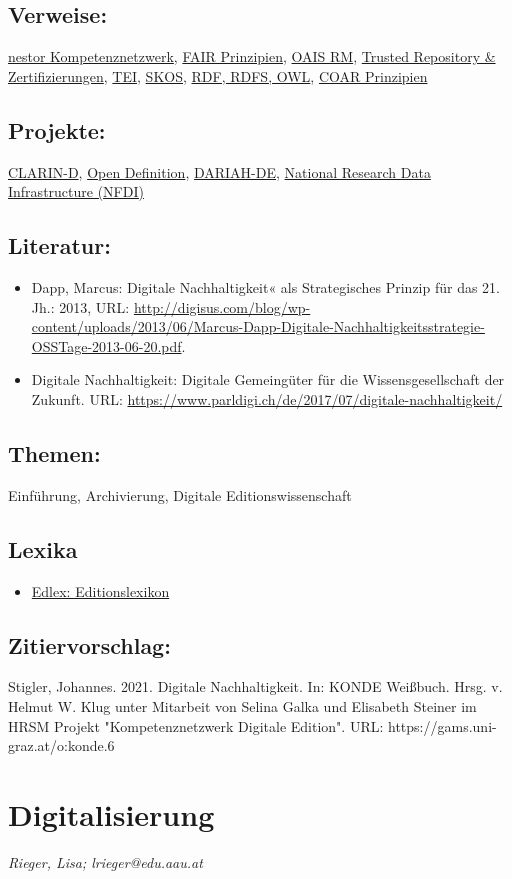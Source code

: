 \documentclass{article}
\begin{document}
        \subsection*{Verweise:}\href{https://gams.uni-graz.at/o:konde.4}{nestor Kompetenznetzwerk}, \href{https://gams.uni-graz.at/o:konde.7}{FAIR Prinzipien}, \href{https://gams.uni-graz.at/o:konde.11}{OAIS RM}, \href{https://gams.uni-graz.at/o:konde.13}{Trusted Repository & Zertifizierungen}, \href{https://gams.uni-graz.at/o:konde.178}{TEI}, \href{https://gams.uni-graz.at/o:konde.132}{SKOS}, \href{https://gams.uni-graz.at/o:konde.131}{RDF, RDFS, OWL}, \href{https://gams.uni-graz.at/o:konde.3}{COAR Prinzipien}\subsection*{Projekte:}\href{https://www.clarin-d.net/de/}{CLARIN-D}, \href{http://opendefinition.org/}{Open Definition}, \href{https://de.dariah.eu/}{DARIAH-DE}, \href{https://www.youtube.com/watch?v=x3Cvn1vNQ98&feature=youtu.be}{National Research Data Infrastructure (NFDI)}\subsection*{Literatur:}\begin{itemize}\item Dapp, Marcus: Digitale Nachhaltigkeit« als Strategisches Prinzip für das 21. Jh.: 2013, URL: \url{http://digisus.com/blog/wp-content/uploads/2013/06/Marcus-Dapp-Digitale-Nachhaltigkeitsstrategie-OSSTage-2013-06-20.pdf}.\item Digitale Nachhaltigkeit: Digitale Gemeingüter für die Wissensgesellschaft der Zukunft. URL: \url{https://www.parldigi.ch/de/2017/07/digitale-nachhaltigkeit/}\end{itemize}\subsection*{Themen:}Einführung, Archivierung, Digitale Editionswissenschaft\subsection*{Lexika}\begin{itemize}\item \href{https://edlex.de/index.php?title=Langzeitarchivierung}{Edlex: Editionslexikon}\end{itemize}\subsection*{Zitiervorschlag:}Stigler, Johannes. 2021. Digitale Nachhaltigkeit. In: KONDE Weißbuch. Hrsg. v. Helmut W. Klug unter Mitarbeit von Selina Galka und Elisabeth Steiner im HRSM Projekt "Kompetenznetzwerk Digitale Edition". URL: https://gams.uni-graz.at/o:konde.6\newpage\section*{Digitalisierung} \emph{Rieger, Lisa; lrieger@edu.aau.at }\\
        
\end{document}
